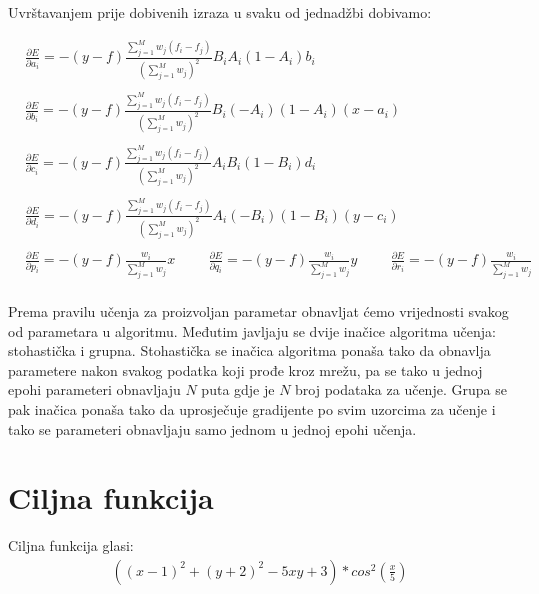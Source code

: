 \documentclass{article}
\begin{document}
Uvrštavanjem prije dobivenih izraza u svaku od jednadžbi dobivamo:

\begin{align*}
	&\frac{\partial E}{\partial a_{i}} = -(y - f) \frac{\sum_{j=1}^{M} w_{j}(f_{i} - f_{j})}{(\sum_{j=1}^{M} w_{j})^2} B_{i} A_{i} (1 - A_{i}) b_{i} \\ \\
	&\frac{\partial E}{\partial b_{i}} = -(y - f) \frac{\sum_{j=1}^{M} w_{j}(f_{i} - f_{j})}{(\sum_{j=1}^{M} w_{j})^2} B_{i} (-A_{i})(1 - A_{i})(x - a_{i}) \\ \\
	&\frac{\partial E}{\partial c_{i}} = -(y - f) \frac{\sum_{j=1}^{M} w_{j}(f_{i} - f_{j})}{(\sum_{j=1}^{M} w_{j})^2} A_{i} B_{i} (1 - B_{i}) d_{i} \\ \\
	&\frac{\partial E}{\partial d_{i}} = -(y - f) \frac{\sum_{j=1}^{M} w_{j}(f_{i} - f_{j})}{(\sum_{j=1}^{M} w_{j})^2} A_{i} (-B_{i})(1 - B_{i})(y - c_{i}) \\ \\
	&\frac{\partial E}{\partial p_{i}} = -(y - f) \frac{w_{i}}{\sum_{j=1}^{M} w_{j}} x \hspace{1cm}
	\frac{\partial E}{\partial q_{i}} = -(y - f) \frac{w_{i}}{\sum_{j=1}^{M} w_{j}} y \hspace{1cm}
	\frac{\partial E}{\partial r_{i}} = -(y - f) \frac{w_{i}}{\sum_{j=1}^{M} w_{j}} \\
\end{align*}


Prema pravilu učenja za proizvoljan parametar obnavljat ćemo vrijednosti svakog od parametara u algoritmu. Međutim javljaju se dvije inačice algoritma učenja: stohastička i grupna. Stohastička se inačica algoritma ponaša tako da obnavlja parametere nakon svakog podatka koji prođe kroz mrežu, pa se tako u jednoj epohi parameteri obnavljaju $N$ puta gdje je $N$ broj podataka za učenje. Grupa se pak inačica ponaša tako da uprosječuje gradijente po svim uzorcima za učenje i tako se parameteri obnavljaju samo jednom u jednoj epohi učenja. 

\section{Ciljna funkcija}

Ciljna funkcija glasi:
\begin{align*}
	((x - 1)^2 + (y + 2)^2 - 5xy + 3) * cos^2(\frac{x}{5})
\end{align*}
\end{document}
